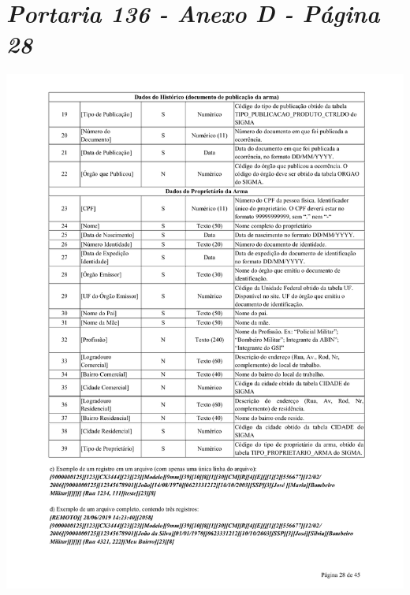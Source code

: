 \chapter{\textit{Portaria 136 - Anexo D - Página 28}}
\includegraphics[scale=0.8]{imagens/AnexoA3-AnexoD-portaria-136}

